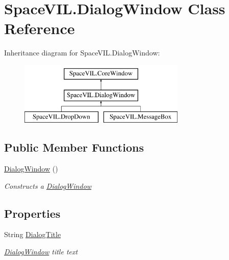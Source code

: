 \hypertarget{class_space_v_i_l_1_1_dialog_window}{}\section{Space\+V\+I\+L.\+Dialog\+Window Class Reference}
\label{class_space_v_i_l_1_1_dialog_window}
Inheritance diagram for Space\+V\+I\+L.\+Dialog\+Window\+:\begin{figure}[H]
\begin{center}
\leavevmode
\includegraphics[height=3.000000cm]{class_space_v_i_l_1_1_dialog_window}
\end{center}
\end{figure}
\subsection*{Public Member Functions}
\begin{DoxyCompactItemize}
\item 
\mbox{\hyperlink{class_space_v_i_l_1_1_dialog_window_afe7940f2348ea9f8d760c2b7ce4877c2}{Dialog\+Window}} ()
\begin{DoxyCompactList}\small\item\em Constructs a \mbox{\hyperlink{class_space_v_i_l_1_1_dialog_window}{Dialog\+Window}} \end{DoxyCompactList}\end{DoxyCompactItemize}
\subsection*{Properties}
\begin{DoxyCompactItemize}
\item 
String \mbox{\hyperlink{class_space_v_i_l_1_1_dialog_window_a91fb9fd6d98afaad9d89a88891bb3250}{Dialog\+Title}}
\begin{DoxyCompactList}\small\item\em \mbox{\hyperlink{class_space_v_i_l_1_1_dialog_window}{Dialog\+Window}} title text \end{DoxyCompactList}\end{DoxyCompactItemize}



